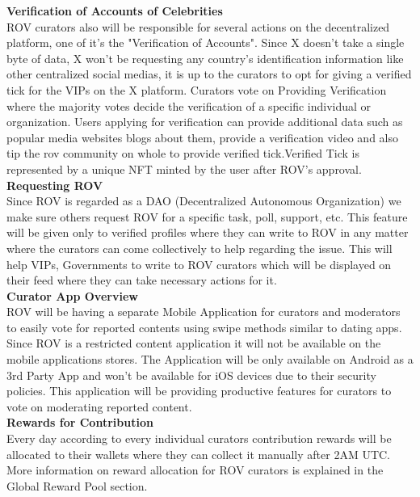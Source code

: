 \documentclass[letterpaper,11pt]{article}
\begin{document}
\textbf{Verification of Accounts of Celebrities}\\

ROV curators also will be responsible for several actions on the decentralized platform, one of it's the "Verification of Accounts". Since X doesn’t take a single byte of data, X won’t be requesting any country’s identification information like other centralized social medias, it is up to the curators to opt for giving a verified tick for the VIPs on the X platform. Curators vote on Providing Verification where the majority votes decide the verification of a specific individual or organization. Users applying for verification can provide additional data such as popular media websites blogs about them, provide a verification video and also tip the rov community on whole to provide verified tick.Verified Tick is represented by a unique NFT minted by the user after ROV's approval.\\

\textbf{Requesting ROV}\\

Since ROV is regarded as a DAO (Decentralized Autonomous Organization) we make sure others request ROV for a specific task, poll, support, etc. This feature will be given only to verified profiles where they can write to ROV in any matter where the curators can come collectively to help regarding the issue. This will help VIPs, Governments to write to ROV curators which will be displayed on their feed where they can take necessary actions for it. \\

\textbf{Curator App Overview}\\

ROV will be having a separate Mobile Application for curators and moderators to easily vote for reported contents using swipe methods similar to dating apps. Since ROV is a restricted content application it will not be available on the mobile applications stores. The Application will be only available on Android as a 3rd Party App and won’t be available for iOS devices due to their security policies. This application will be providing productive features for curators to vote on moderating reported content. \\


\textbf{Rewards for Contribution}\\

Every day according to every individual curators contribution rewards will be allocated to their wallets where they can collect it manually after 2AM UTC.  More information on reward allocation for ROV curators is explained in the Global Reward Pool section.\\
\end{document}
